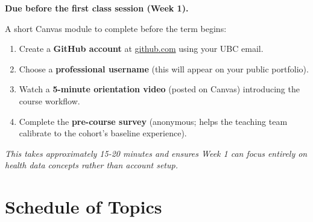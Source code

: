 \documentclass[
  letterpaper,
  DIV=11,
  numbers=noendperiod,
  oneside]{scrreprt}
\providecommand{\tightlist}{%
  \setlength{\itemsep}{0pt}\setlength{\parskip}{0pt}}
\begin{document}
\textbf{Due before the first class session (Week 1).}

A short Canvas module to complete before the term begins:

\begin{enumerate}
\def\labelenumi{\arabic{enumi}.}
\tightlist
\item
  Create a \textbf{GitHub account} at
  \href{https://github.com}{github.com} using your UBC email.
\item
  Choose a \textbf{professional username} (this will appear on your
  public portfolio).
\item
  Watch a \textbf{5-minute orientation video} (posted on Canvas)
  introducing the course workflow.
\item
  Complete the \textbf{pre-course survey} (anonymous; helps the teaching
  team calibrate to the cohort's baseline experience).
\end{enumerate}

\emph{This takes approximately 15-20 minutes and ensures Week 1 can
focus entirely on health data concepts rather than account setup.}

\section{Schedule of Topics}\label{schedule-of-topics}

\begingroup\fontsize{10}{12}\selectfont
\end{document}

